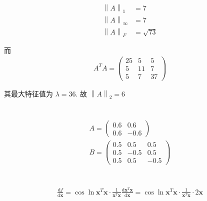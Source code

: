 \documentclass{article}
\newcommand{\dd}{\mathrm{d}}
\newcommand{\bx}{\boldsymbol{x}}
\begin{document}
\section{}

\begin{align*}
    \left\lVert A\right\rVert_1 &= 7 \\
    \left\lVert A\right\rVert_\infty &= 7 \\
    \left\lVert A\right\rVert_F &= \sqrt{73} 
\end{align*}

而 \begin{align*}
    A^TA = \begin{pmatrix}25 & 5 & 5\\5 & 11 & 7\\5 & 7 & 37\end{pmatrix}
\end{align*}

其最大特征值为 $\lambda = 36$. 故 $\left\lVert A\right\rVert_2 = 6$

\section{}

\begin{align*}
    A = \begin{pmatrix}
        0.6 & 0.6 \\
        0.6 & -0.6
    \end{pmatrix} \\
    B = \begin{pmatrix}
        0.5 & 0.5 & 0.5 \\
        0.5 & -0.5 & 0.5 \\
        0.5 & 0.5 & -0.5
    \end{pmatrix}
\end{align*}

\section{}

\begin{align*}
    \frac{\dd f}{\dd \boldsymbol{x}} = \cos \ln \bx^T \bx \cdot \frac{1}{\bx^T \bx} \frac{\dd \bx^T \bx}{\dd \bx} = \cos \ln \bx^T \bx \cdot \frac{1}{\bx^T \bx}\cdot 2\bx
\end{align*}

\section{}
\end{document}
